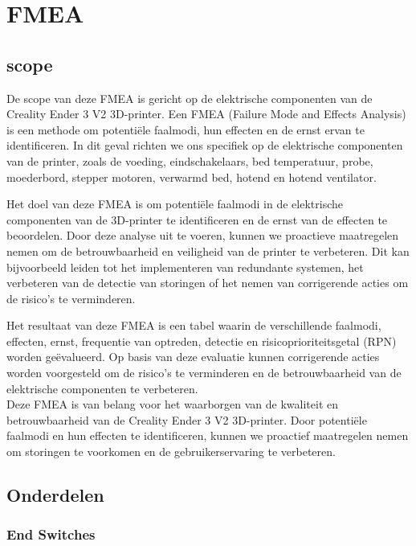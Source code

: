 \documentclass{article}
\begin{document}
\newpage
\section{FMEA}
\setlength{\parindent}{0pt} %
\subsection{scope}
De scope van deze FMEA is gericht op de elektrische componenten van de Creality Ender 3 V2 3D-printer. Een FMEA (Failure Mode and Effects Analysis) is een methode om potentiële faalmodi, hun effecten en de ernst ervan te identificeren. In dit geval richten we ons specifiek op de elektrische componenten van de printer, zoals de voeding, eindschakelaars, bed temperatuur, probe, moederbord, stepper motoren, verwarmd bed, hotend en hotend ventilator.

Het doel van deze FMEA is om potentiële faalmodi in de elektrische componenten van de 3D-printer te identificeren en de ernst van de effecten te beoordelen. Door deze analyse uit te voeren, kunnen we proactieve maatregelen nemen om de betrouwbaarheid en veiligheid van de printer te verbeteren. Dit kan bijvoorbeeld leiden tot het implementeren van redundante systemen, het verbeteren van de detectie van storingen of het nemen van corrigerende acties om de risico's te verminderen.

Het resultaat van deze FMEA is een tabel waarin de verschillende faalmodi, effecten, ernst, frequentie van optreden, detectie en risicoprioriteitsgetal (RPN) worden geëvalueerd. Op basis van deze evaluatie kunnen corrigerende acties worden voorgesteld om de risico's te verminderen en de betrouwbaarheid van de elektrische componenten te verbeteren.
\\
Deze FMEA is van belang voor het waarborgen van de kwaliteit en betrouwbaarheid van de Creality Ender 3 V2 3D-printer. Door potentiële faalmodi en hun effecten te identificeren, kunnen we proactief maatregelen nemen om storingen te voorkomen en de gebruikerservaring te verbeteren.

\subsection{Onderdelen}
\subsubsection*{End Switches}
\end{document}
